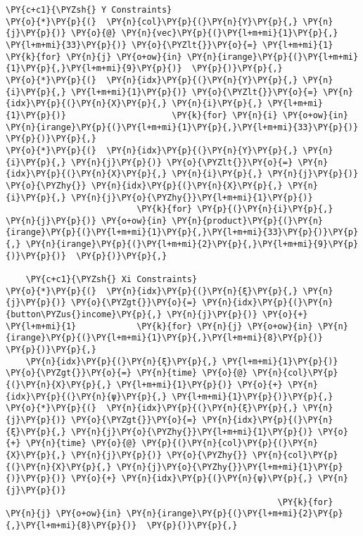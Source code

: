 \begin{tcolorbox}[breakable, size=fbox, boxrule=1pt, pad at break*=1mm,colback=cellbackground, colframe=cellborder]
\begin{Verbatim}[commandchars=\\\{\}]
    \PY{c+c1}{\PYZsh{} Y Constraints}
\PY{o}{*}\PY{p}{(}  \PY{n}{col}\PY{p}{(}\PY{n}{Y}\PY{p}{,} \PY{n}{j}\PY{p}{)} \PY{o}{@} \PY{n}{vec}\PY{p}{(}\PY{l+m+mi}{1}\PY{p}{,} \PY{l+m+mi}{33}\PY{p}{)} \PY{o}{\PYZlt{}}\PY{o}{=} \PY{l+m+mi}{1}                       \PY{k}{for} \PY{n}{j} \PY{o+ow}{in} \PY{n}{irange}\PY{p}{(}\PY{l+m+mi}{1}\PY{p}{,}\PY{l+m+mi}{9}\PY{p}{)}  \PY{p}{)}\PY{p}{,}
\PY{o}{*}\PY{p}{(}  \PY{n}{idx}\PY{p}{(}\PY{n}{Y}\PY{p}{,} \PY{n}{i}\PY{p}{,} \PY{l+m+mi}{1}\PY{p}{)} \PY{o}{\PYZlt{}}\PY{o}{=} \PY{n}{idx}\PY{p}{(}\PY{n}{X}\PY{p}{,} \PY{n}{i}\PY{p}{,} \PY{l+m+mi}{1}\PY{p}{)}                     \PY{k}{for} \PY{n}{i} \PY{o+ow}{in} \PY{n}{irange}\PY{p}{(}\PY{l+m+mi}{1}\PY{p}{,}\PY{l+m+mi}{33}\PY{p}{)}  \PY{p}{)}\PY{p}{,}
\PY{o}{*}\PY{p}{(}  \PY{n}{idx}\PY{p}{(}\PY{n}{Y}\PY{p}{,} \PY{n}{i}\PY{p}{,} \PY{n}{j}\PY{p}{)} \PY{o}{\PYZlt{}}\PY{o}{=} \PY{n}{idx}\PY{p}{(}\PY{n}{X}\PY{p}{,} \PY{n}{i}\PY{p}{,} \PY{n}{j}\PY{p}{)} \PY{o}{\PYZhy{}} \PY{n}{idx}\PY{p}{(}\PY{n}{X}\PY{p}{,} \PY{n}{i}\PY{p}{,} \PY{n}{j}\PY{o}{\PYZhy{}}\PY{l+m+mi}{1}\PY{p}{)}
                          \PY{k}{for} \PY{p}{(}\PY{n}{i}\PY{p}{,} \PY{n}{j}\PY{p}{)} \PY{o+ow}{in} \PY{n}{product}\PY{p}{(}\PY{n}{irange}\PY{p}{(}\PY{l+m+mi}{1}\PY{p}{,}\PY{l+m+mi}{33}\PY{p}{)}\PY{p}{,} \PY{n}{irange}\PY{p}{(}\PY{l+m+mi}{2}\PY{p}{,}\PY{l+m+mi}{9}\PY{p}{)}\PY{p}{)}  \PY{p}{)}\PY{p}{,}

    \PY{c+c1}{\PYZsh{} Xi Constraints}
\PY{o}{*}\PY{p}{(}  \PY{n}{idx}\PY{p}{(}\PY{n}{ξ}\PY{p}{,} \PY{n}{j}\PY{p}{)} \PY{o}{\PYZgt{}}\PY{o}{=} \PY{n}{idx}\PY{p}{(}\PY{n}{button\PYZus{}income}\PY{p}{,} \PY{n}{j}\PY{p}{)} \PY{o}{+} \PY{l+m+mi}{1}            \PY{k}{for} \PY{n}{j} \PY{o+ow}{in} \PY{n}{irange}\PY{p}{(}\PY{l+m+mi}{1}\PY{p}{,}\PY{l+m+mi}{8}\PY{p}{)}  \PY{p}{)}\PY{p}{,}
    \PY{n}{idx}\PY{p}{(}\PY{n}{ξ}\PY{p}{,} \PY{l+m+mi}{1}\PY{p}{)} \PY{o}{\PYZgt{}}\PY{o}{=} \PY{n}{time} \PY{o}{@} \PY{n}{col}\PY{p}{(}\PY{n}{X}\PY{p}{,} \PY{l+m+mi}{1}\PY{p}{)} \PY{o}{+} \PY{n}{idx}\PY{p}{(}\PY{n}{ψ}\PY{p}{,} \PY{l+m+mi}{1}\PY{p}{)}\PY{p}{,}
\PY{o}{*}\PY{p}{(}  \PY{n}{idx}\PY{p}{(}\PY{n}{ξ}\PY{p}{,} \PY{n}{j}\PY{p}{)} \PY{o}{\PYZgt{}}\PY{o}{=} \PY{n}{idx}\PY{p}{(}\PY{n}{ξ}\PY{p}{,} \PY{n}{j}\PY{o}{\PYZhy{}}\PY{l+m+mi}{1}\PY{p}{)} \PY{o}{+} \PY{n}{time} \PY{o}{@} \PY{p}{(}\PY{n}{col}\PY{p}{(}\PY{n}{X}\PY{p}{,} \PY{n}{j}\PY{p}{)} \PY{o}{\PYZhy{}} \PY{n}{col}\PY{p}{(}\PY{n}{X}\PY{p}{,} \PY{n}{j}\PY{o}{\PYZhy{}}\PY{l+m+mi}{1}\PY{p}{)}\PY{p}{)} \PY{o}{+} \PY{n}{idx}\PY{p}{(}\PY{n}{ψ}\PY{p}{,} \PY{n}{j}\PY{p}{)}
                                                      \PY{k}{for} \PY{n}{j} \PY{o+ow}{in} \PY{n}{irange}\PY{p}{(}\PY{l+m+mi}{2}\PY{p}{,}\PY{l+m+mi}{8}\PY{p}{)}  \PY{p}{)}\PY{p}{,}


\end{Verbatim}
\end{tcolorbox}
